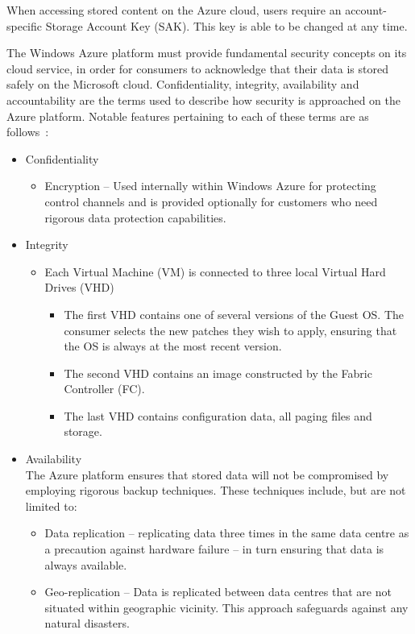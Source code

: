 When accessing stored content on the Azure cloud, users require an account-specific Storage Account Key (SAK). This key is able to be changed at any time.

The Windows Azure platform must provide fundamental security concepts on its cloud service, in order for consumers to acknowledge that their data is stored safely on the Microsoft cloud. Confidentiality, integrity, availability and accountability are the terms used to describe how security is approached on the Azure platform. Notable features pertaining to each of these terms are as follows~\cite{AzureSecurity}:

\begin{itemize}
\item Confidentiality
\begin{itemize}
\item Encryption -- Used internally within Windows Azure for protecting control channels and is provided optionally for customers who need rigorous data protection capabilities. 
\end{itemize}
\item Integrity
\begin{itemize}
\item Each Virtual Machine (VM) is connected to three local Virtual Hard Drives (VHD)
\begin{itemize}
\item The first VHD contains one of several versions of the Guest OS. The consumer selects the new patches they wish to apply, ensuring that the OS is always at the most recent version.
\item The second VHD contains an image constructed by the Fabric Controller (FC).
\item The last VHD contains configuration data, all paging files and storage. 
\end{itemize}
\end{itemize}
\item Availability \\ The Azure platform ensures that stored data will not be compromised by employing rigorous backup techniques. These techniques include, but are not limited to\ftAfour:\ftAfourText
\begin{itemize}
\item Data replication -- replicating data three times in the same data centre as a precaution against hardware failure – in turn ensuring that data is always available.
\item Geo-replication -- Data is replicated between data centres that are not situated within geographic vicinity. This approach safeguards against any natural disasters.
\end{itemize}


\end{itemize}
